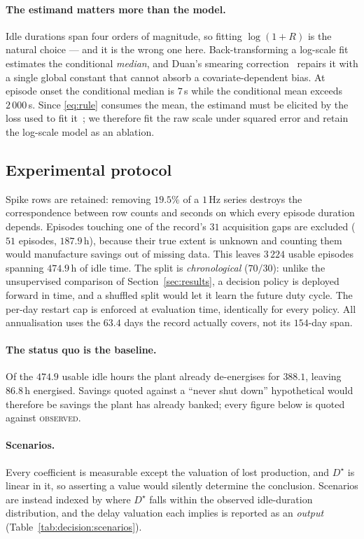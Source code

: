 \paragraph{The estimand matters more than the model.}
Idle durations span four orders of magnitude, so fitting
$\log(1+R)$ is the natural choice --- and it is the wrong one here.
Back-transforming a log-scale fit estimates the conditional
\emph{median}, and Duan's smearing correction~\cite{duan1983smearing}
repairs it with a single global constant that cannot absorb a
covariate-dependent bias. At episode onset the conditional median is
$7$\,s while the conditional mean exceeds $2\,000$\,s. Since
\eqref{eq:rule} consumes the mean, the estimand must be elicited by the
loss used to fit it~\cite{gneiting2011making}; we therefore fit the raw
scale under squared error and retain the log-scale model as an ablation.

\subsection{Experimental protocol}
\label{sec:decision:protocol}

Spike rows are retained: removing $19.5\%$ of a $1$\,Hz series destroys
the correspondence between row counts and seconds on which every episode
duration depends. Episodes touching one of the record's $31$
acquisition gaps are excluded ($51$ episodes, $187.9$\,h), because their
true extent is unknown and counting them would manufacture savings out
of missing data. This leaves $3\,224$ usable episodes spanning
$474.9$\,h of idle time. The split is \emph{chronological} ($70/30$):
unlike the unsupervised comparison of Section~\ref{sec:results}, a
decision policy is deployed forward in time, and a shuffled split would
let it learn the future duty cycle. The per-day restart cap is enforced
at evaluation time, identically for every policy. All annualisation uses
the $63.4$ days the record actually covers, not its $154$-day span.

\paragraph{The status quo is the baseline.}
Of the $474.9$ usable idle hours the plant already de-energises for
$388.1$, leaving $86.8$\,h energised. Savings quoted against a
``never shut down'' hypothetical would therefore be savings the plant has
already banked; every figure below is quoted against \textsc{observed}.

\paragraph{Scenarios.}
Every coefficient is measurable except the valuation of lost production,
and $D^{\star}$ is linear in it, so asserting a value would silently
determine the conclusion. Scenarios are instead indexed by where
$D^{\star}$ falls within the observed idle-duration distribution, and the
delay valuation each implies is reported as an \emph{output}
(Table~\ref{tab:decision:scenarios}).

